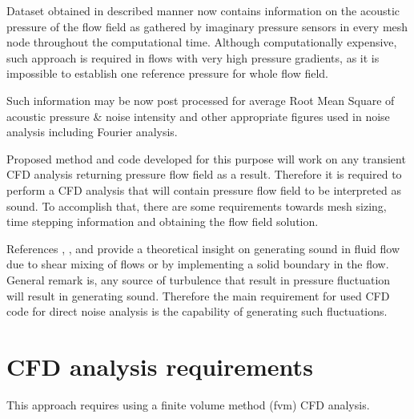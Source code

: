 Dataset obtained in described manner now contains information on the acoustic pressure of the flow field as gathered by imaginary pressure sensors in every mesh node throughout the computational time. Although computationally expensive, such approach is required in flows with very high pressure gradients, as it is impossible to establish one reference pressure for whole flow field.

Such information may be now post processed for average Root Mean Square of acoustic pressure \& noise intensity and other appropriate figures used in noise analysis including Fourier analysis.

Proposed method and code developed for this purpose will work on any transient CFD analysis returning pressure flow field as a result. Therefore it is required to perform a CFD analysis that will contain pressure flow field to be interpreted as sound. To accomplish that, there are some requirements towards mesh sizing, time stepping information and obtaining the flow field solution. 

References \citep{Light1}, \citep{Light2}, \citep{FWH} and \citep{curle} provide a theoretical insight on generating sound in fluid flow due to shear mixing of flows or by implementing a solid boundary in the flow. General remark is, any source of turbulence that result in pressure fluctuation will result in generating sound. Therefore the main requirement for used CFD code for direct noise analysis is the capability of generating such fluctuations. 

\section{CFD analysis requirements}
This approach requires using a finite volume method (fvm) CFD analysis.



